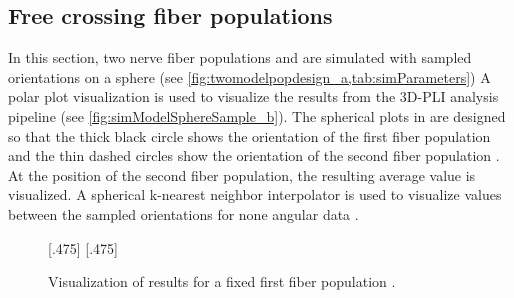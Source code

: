 \subsection{Free crossing fiber populations}
\label{sec:resFreeCross}
%
In this section, two nerve fiber populations \popa{} and \popb{} are simulated with sampled orientations on a sphere (see \cref{fig:twomodelpopdesign_a,tab:simParameters})
A polar plot visualization is used to visualize the results from the \ac{3D-PLI} analysis pipeline (see \cref{fig:simModelSphereSample_b}).
The spherical plots in %
are designed so that the thick black circle shows the orientation of the first fiber population \popa{} and the thin dashed circles show the orientation of the second fiber population \popb{}.
At the position of the second fiber population, the resulting average value is visualized.
A spherical k-nearest neighbor interpolator is used to visualize values between the sampled orientations for none angular data \cite{DBLP:journals/corr/abs-1910-00704}.
\par
% 
\begin{figure}[t]
\centering
\setlength{\tikzwidth}{0.40\textwidth}
[.475\textwidth]{}
\hfill
{}
[.475\textwidth]{}
\caption{Visualization of results for a fixed first fiber population \popa{}.}
\label{fig:simModelSphereSample}
\end{figure}
%
%
%
